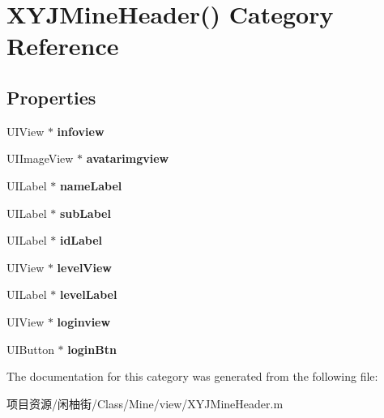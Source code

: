 \hypertarget{category_x_y_j_mine_header_07_08}{}\section{X\+Y\+J\+Mine\+Header() Category Reference}
\label{category_x_y_j_mine_header_07_08}
\subsection*{Properties}
\begin{DoxyCompactItemize}
\item 
\mbox{\label{category_x_y_j_mine_header_07_08_aec1af500b76c6c95f652f96938611075}} 
U\+I\+View $\ast$ {\bfseries infoview}
\item 
\mbox{\label{category_x_y_j_mine_header_07_08_a77c97f3f5dedc441472061c2f355c8d1}} 
U\+I\+Image\+View $\ast$ {\bfseries avatarimgview}
\item 
\mbox{\label{category_x_y_j_mine_header_07_08_a818c4e5942f9037a24e7c0e3d9e47773}} 
U\+I\+Label $\ast$ {\bfseries name\+Label}
\item 
\mbox{\label{category_x_y_j_mine_header_07_08_ad8d349a6f351ebe9148dd67d8259cad5}} 
U\+I\+Label $\ast$ {\bfseries sub\+Label}
\item 
\mbox{\label{category_x_y_j_mine_header_07_08_a818f02926b671f0b67731f80ab6c1eb4}} 
U\+I\+Label $\ast$ {\bfseries id\+Label}
\item 
\mbox{\label{category_x_y_j_mine_header_07_08_a2c3a210b6162ba625bfd3d15e9ffd0b7}} 
U\+I\+View $\ast$ {\bfseries level\+View}
\item 
\mbox{\label{category_x_y_j_mine_header_07_08_a947bd5b58e8c078baa342d25855c326e}} 
U\+I\+Label $\ast$ {\bfseries level\+Label}
\item 
\mbox{\label{category_x_y_j_mine_header_07_08_a83518749a98204264bf09853ccc0b471}} 
U\+I\+View $\ast$ {\bfseries loginview}
\item 
\mbox{\label{category_x_y_j_mine_header_07_08_a73f4a0275fb9b78b75b27cc017566ea8}} 
U\+I\+Button $\ast$ {\bfseries login\+Btn}
\end{DoxyCompactItemize}


The documentation for this category was generated from the following file\+:\begin{DoxyCompactItemize}
\item 
项目资源/闲柚街/\+Class/\+Mine/view/X\+Y\+J\+Mine\+Header.\+m\end{DoxyCompactItemize}
